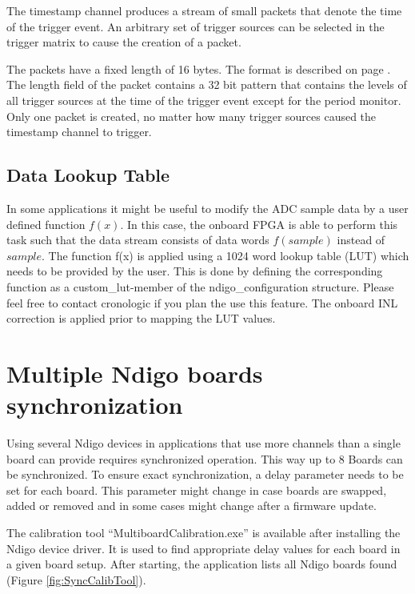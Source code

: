         The timestamp channel produces a stream of small packets that denote the time of the trigger event. An arbitrary set of trigger sources can be selected in the trigger matrix to cause the creation of a packet.\par

        The packets have a fixed length of 16 bytes. The format is described on page \pageref{cp:packetformat}. The length field of the packet contains a 32 bit pattern that contains the levels of all trigger sources at the time of the trigger event except for the period monitor. Only one packet is created, no matter how many trigger sources caused the timestamp channel to trigger.

    \subsection{Data Lookup Table}

        In some applications it might be useful to modify the ADC sample data by a user defined function $f(x)$. In this case, the onboard FPGA is able to perform this task such that the data stream consists of data words $f(sample)$ instead of $sample$. The function f(x) is applied using a 1024 word lookup table (LUT) which needs to be provided by the user. This is done by defining the corresponding function as a custom\_lut-member of the ndigo\_configuration structure. Please feel free to contact cronologic if you plan the use this feature. The onboard INL correction is applied prior to mapping the LUT values.

\section{Multiple Ndigo boards synchronization}
    Using several Ndigo devices in applications that use more channels than a single board can provide requires synchronized operation. This way up to 8 Boards can be synchronized. To ensure exact synchronization, a delay parameter needs to be set for each board. This parameter might change in case boards are swapped, added or removed and in some cases might change after a firmware update.\par

    The calibration tool ``MultiboardCalibration.exe'' is available after installing the Ndigo device driver. It is used to find appropriate delay values for each board in a given board setup. After starting, the application lists all Ndigo boards found (Figure \ref{fig:SyncCalibTool}).\par

